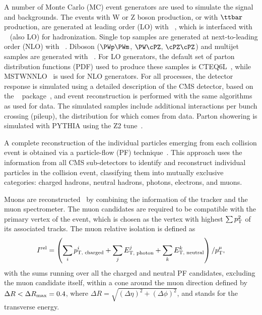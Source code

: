 A number of Monte Carlo (MC) event generators are used to simulate the signal and
backgrounds. 
The  events with W or Z boson production, or with $\ttbar$ production, are generated at leading order (LO) 
with ~\cite{Madgraph5}, which is interfaced with ~\cite{Sjostrand:2006za} (also LO)
for hadronization.
Single top samples are generated at next-to-leading order (NLO) with 
~\cite{Alioli:2008gx,Nason:2004rx,Frixione:2007vw}.
Diboson ($\WW$, $\WZ$, $\ZZ$) and multijet samples are
generated with 
~\cite{Sjostrand:2006za}. 
For LO generators, the default set of parton distribution functions
(PDF) used to produce these samples is CTEQ6L~\cite{CTEQ66}, while
MSTWNNLO~\cite{Martin:2009iq} is used for NLO generators.
For all processes, the detector response is simulated using a detailed
description of the CMS detector, based on the \GEANTfour~
package~\cite{GEANT}, and event reconstruction is performed with
the same algorithms as used for data.
The simulated samples include additional interactions per bunch crossing (pileup),
the distribution for which comes from data.
Parton showering is simulated with PYTHIA using the Z2 tune~\cite{Field:2010bc}.

A complete reconstruction of the individual particles emerging from each collision event is obtained 
via a particle-flow (PF) technique~\cite{CMS-PAS-PFT-09-001, CMS-PAS-PFT-10-002}. This 
approach uses the information from all CMS sub-detectors to identify and 
reconstruct individual particles in the collision event, classifying 
them into mutually exclusive categories: charged hadrons, neutral hadrons, photons, electrons, and muons.

Muons are reconstructed~\cite{CMS-PAS-MUO-10-002}
by combining the information of the tracker and the muon spectrometer.
The muon candidates are required to be compatible with the primary vertex of the
event, which is chosen as the vertex with highest $\sum p_\mathrm{T}^2$ of its associated tracks.
The muon relative isolation is defined as
\begin{equation*}
I^{\rm{rel}} = \left( \sum_{i}
p_{\text{T, charged}}^i+ \sum_{j}  E_{\text{T, photon}}^j  +\sum_{k}  E_{\text{T, neutral}}^k \right) /p_\mathrm{T}^{\mu},
\end{equation*}
with the sums running over all the charged and neutral PF candidates,
excluding the muon candidate itself, 
within a cone around the muon direction
defined by  $\Delta R  < \Delta R_{\rm max} = 0.4$,
where
$\Delta R = \sqrt { (\Delta \eta)^2 + (\Delta \phi)^2 }$, and
\ET stands for the
transverse energy.

